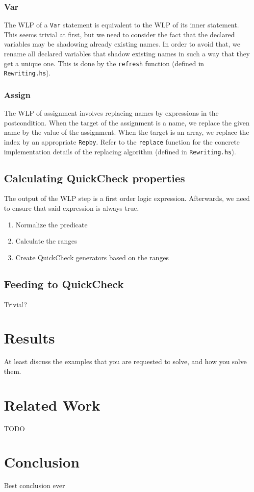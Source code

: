 \documentclass[a4paper]{article}
\begin{document}
\subsubsection*{Var}

The WLP of a \texttt{Var} statement is equivalent to the WLP of its inner statement.
This seems trivial at first, but we need to consider the fact that the declared
variables may be shadowing already existing names. In order to avoid that, we
rename all declared variables that shadow existing names in such a way that they get
a unique one. This is done by the \texttt{refresh} function (defined in \texttt{Rewriting.hs}).


\subsubsection*{Assign}

The WLP of assignment involves replacing names by expressions in the postcondition.
When the target of the assignment is a name, we replace the given name by the value
of the assignment. When the target is an array, we replace the index by an appropriate
\texttt{Repby}. Refer to the \texttt{replace} function for the concrete implementation
details of the replacing algorithm (defined in \texttt{Rewriting.hs}).

\subsection{Calculating QuickCheck properties}

The output of the WLP step is a first order logic expression. Afterwards, we
need to ensure that said expression is always true.

\begin{enumerate}
\item Normalize the predicate
\item Calculate the ranges
\item Create QuickCheck generators based on the ranges
\end{enumerate}

\subsection{Feeding to QuickCheck}

Trivial?

\section{Results}

At least discuss the examples that you are requested
to solve, and how you solve them.

\section{Related Work}

TODO

\section{Conclusion}

Best conclusion ever



\end{document}
